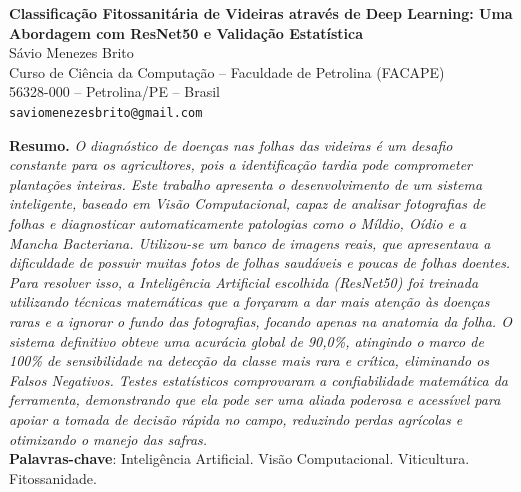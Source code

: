 \documentclass[12pt, a4paper]{article}
\begin{document}
\pagestyle{empty}
\thispagestyle{empty}

\begin{center}
    {\Large \textbf{Classificação Fitossanitária de Videiras através de Deep Learning: Uma Abordagem com ResNet50 e Validação Estatística}} \\[1.5em]
    {\large Sávio Menezes Brito} \\[1em]
    Curso de Ciência da Computação -- Faculdade de Petrolina (FACAPE) \\
    56328-000 -- Petrolina/PE -- Brasil \\[0.5em]
    \texttt{saviomenezesbrito@gmail.com}
\end{center}

\vspace{1em}

\begin{center}
\begin{minipage}{0.9\textwidth}
\noindent \textbf{Resumo.} \textit{O diagnóstico de doenças nas folhas das videiras é um desafio constante para os agricultores, pois a identificação tardia pode comprometer plantações inteiras. Este trabalho apresenta o desenvolvimento de um sistema inteligente, baseado em Visão Computacional, capaz de analisar fotografias de folhas e diagnosticar automaticamente patologias como o Míldio, Oídio e a Mancha Bacteriana. Utilizou-se um banco de imagens reais, que apresentava a dificuldade de possuir muitas fotos de folhas saudáveis e poucas de folhas doentes. Para resolver isso, a Inteligência Artificial escolhida (ResNet50) foi treinada utilizando técnicas matemáticas que a forçaram a dar mais atenção às doenças raras e a ignorar o fundo das fotografias, focando apenas na anatomia da folha. O sistema definitivo obteve uma acurácia global de 90,0\%, atingindo o marco de 100\% de sensibilidade na detecção da classe mais rara e crítica, eliminando os Falsos Negativos. Testes estatísticos comprovaram a confiabilidade matemática da ferramenta, demonstrando que ela pode ser uma aliada poderosa e acessível para apoiar a tomada de decisão rápida no campo, reduzindo perdas agrícolas e otimizando o manejo das safras.} \\[0.5em]
\textbf{Palavras-chave}: Inteligência Artificial. Visão Computacional. Viticultura. Fitossanidade.
\end{minipage}
\end{center}

\vspace{1.5em}
\end{document}
